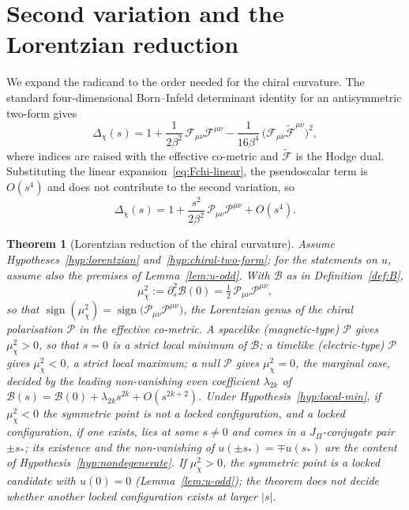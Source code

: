 \documentclass[11pt]{article}
\newtheorem{theorem}{Theorem}
\theoremstyle{definition}
\theoremstyle{remark}
\newcommand{\JPi}{J_{\Pi}}
\newcommand{\Fchi}{\mathcal{F}}
\newcommand{\Pchi}{\mathcal{P}}
\newcommand{\Bsat}{\mathcal{B}}
\newcommand{\Dchi}{\Delta_{\chi}}
\newcommand{\muchi}{\mu_{\chi}^{2}}
\begin{document}
  \section{Second variation and the Lorentzian reduction}
    \label{sec:reduction}

    We expand the radicand to the order needed for the chiral curvature.
    The standard four-dimensional Born--Infeld determinant identity for an antisymmetric two-form gives
    \begin{equation}
      \label{eq:det-expansion}
      \Dchi(s) = 1 + \frac{1}{2\beta^2}\, \Fchi_{\mu\nu} \Fchi^{\mu\nu}
      - \frac{1}{16\beta^4}\, \big(\Fchi_{\mu\nu} \widetilde{\Fchi}^{\mu\nu}\big)^2 ,
    \end{equation}
    where indices are raised with the effective co-metric and $\widetilde{\Fchi}$ is the Hodge dual.
    Substituting the linear expansion~\eqref{eq:Fchi-linear}, the pseudoscalar term is $O(s^4)$ and does not contribute to
    the
    second variation, so
    \begin{equation}
      \label{eq:Dchi-quadratic}
      \Dchi(s) = 1 + \frac{s^2}{2\beta^2}\, \Pchi_{\mu\nu} \Pchi^{\mu\nu} + O(s^4) .
    \end{equation}

    \begin{theorem}[Lorentzian reduction of the chiral curvature]
      \label{thm:reduction}
      Assume Hypotheses~\ref{hyp:lorentzian} and~\ref{hyp:chiral-two-form}; for the statements on $u$, assume also the
      premises of Lemma~\ref{lem:u-odd}.
      With $\Bsat$ as in Definition~\ref{def:B},
      \begin{equation}
        \label{eq:muchi}
        \muchi := \partial_s^2 \Bsat(0) = \tfrac12\, \Pchi_{\mu\nu} \Pchi^{\mu\nu} ,
      \end{equation}
      so that $\operatorname{sign}(\muchi) = \operatorname{sign}\!\big(\Pchi_{\mu\nu} \Pchi^{\mu\nu}\big)$, the Lorentzian
      genus of the chiral polarisation $\Pchi$ in the effective co-metric.
      A spacelike (magnetic-type) $\Pchi$ gives $\muchi > 0$, so that $s = 0$ is a strict local minimum of $\Bsat$;
      a timelike (electric-type) $\Pchi$ gives $\muchi < 0$, a strict local maximum; a null $\Pchi$ gives $\muchi = 0$,
      the marginal case, decided by the leading non-vanishing even coefficient $\lambda_{2k}$ of
      $\Bsat(s) = \Bsat(0) + \lambda_{2k} s^{2k} + O(s^{2k+2})$.
      Under Hypothesis~\ref{hyp:local-min}, if $\muchi<0$ the symmetric point is not a locked configuration, and a
      locked configuration, if one exists, lies at some $s\neq0$ and comes in a $\JPi$-conjugate pair $\pm s_*$;
      its existence and the non-vanishing of $u(\pm s_*)=\mp u(s_*)$ are the content of
      Hypothesis~\ref{hyp:nondegenerate}.
      If $\muchi>0$, the symmetric point is a locked candidate with $u(0)=0$ (Lemma~\ref{lem:u-odd}); the theorem does
      not decide whether
      another locked configuration exists at larger $|s|$.
    \end{theorem}
\end{document}
